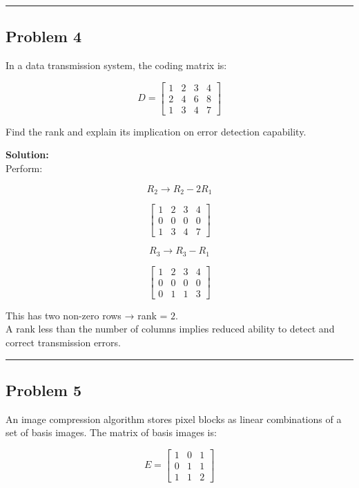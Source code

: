 \documentclass[
  letterpaper,
  DIV=11,
  numbers=noendperiod]{scrreprt}
\begin{document}
\begin{center}\rule{0.5\linewidth}{0.5pt}\end{center}

\subsection{Problem 4}\label{problem-4-1}

In a data transmission system, the coding matrix is:

\[
D =
\begin{bmatrix}
1 & 2 & 3 & 4 \\
2 & 4 & 6 & 8 \\
1 & 3 & 4 & 7
\end{bmatrix}
\]

Find the rank and explain its implication on error detection capability.

\textbf{Solution:}\\
Perform:

\[
R_2 \to R_2 - 2R_1
\]

\[
\begin{bmatrix}
1 & 2 & 3 & 4 \\
0 & 0 & 0 & 0 \\
1 & 3 & 4 & 7
\end{bmatrix}
\]

\[
R_3 \to R_3 - R_1
\]

\[
\begin{bmatrix}
1 & 2 & 3 & 4 \\
0 & 0 & 0 & 0 \\
0 & 1 & 1 & 3
\end{bmatrix}
\]

This has two non-zero rows → rank = \(2\).\\
A rank less than the number of columns implies reduced ability to detect
and correct transmission errors.

\begin{center}\rule{0.5\linewidth}{0.5pt}\end{center}

\subsection{Problem 5}\label{problem-5-1}

An image compression algorithm stores pixel blocks as linear
combinations of a set of basis images. The matrix of basis images is:

\[
E =
\begin{bmatrix}
1 & 0 & 1 \\
0 & 1 & 1 \\
1 & 1 & 2
\end{bmatrix}
\]
\end{document}
